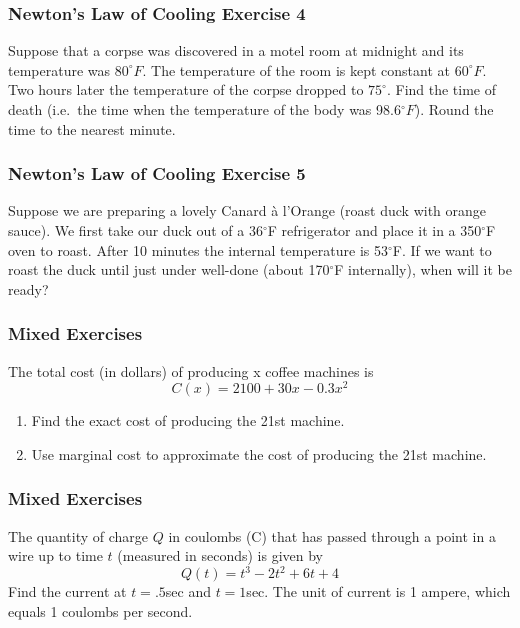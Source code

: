 \documentclass[xcolor=dvipsnames]{beamer}
\begin{document}
\begin{frame}
  \frametitle{Newton's Law of Cooling Exercise 4}
  Suppose that a corpse was discovered in a motel room at midnight and
  its temperature was $80^{\circ}F$. The temperature of the room is
  kept constant at $60^{\circ}F$. Two hours later the temperature of
  the corpse dropped to $75^{\circ}$. Find the time of death (i.e.\
  the time when the temperature of the body was 98.6$^{\circ}F$).
  Round the time to the nearest minute.
\end{frame}

\begin{frame}
  \frametitle{Newton's Law of Cooling Exercise 5}
  Suppose we are preparing a lovely Canard {\`a} l'Orange (roast duck
  with orange sauce). We first take our duck out of a 36$^{\circ}$F
  refrigerator and place it in a 350$^{\circ}$F oven to roast. After
  10 minutes the internal temperature is 53$^{\circ}$F. If we want to
  roast the duck until just under well-done (about 170$^{\circ}$F
  internally), when will it be ready?
\end{frame}

\begin{frame}
  \frametitle{Mixed Exercises}
  The total cost (in dollars) of producing x coffee machines is
  \begin{equation}
    \label{eq:egaireil}
    C(x)=2100+30x-0.3x^{2}
  \end{equation}
  \begin{enumerate}
  \item Find the exact cost of producing the 21st machine.
  \item Use marginal cost to approximate the cost of producing the 21st machine.
  \end{enumerate}
\end{frame}

\begin{frame}
  \frametitle{Mixed Exercises}
  The quantity of charge $Q$ in coulombs (C) that has passed through a
  point in a wire up to time $t$ (measured in seconds) is given by
  \begin{equation}
    \label{eq:iehahphi}
    Q(t)=t^{3}−2t^{2}+6t+4  
  \end{equation}
Find the current at $t=.5$sec and $t=1$sec. The unit of current is 1
ampere, which equals 1 coulombs per second.
\end{frame}
\end{document}
